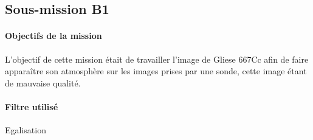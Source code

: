 	\subsection{Sous-mission B1}

	\begin{vwcol}[widths={0.8,0.2}, rule=0pt]
	\begin{minipage}{0.7\textwidth}
	\paragraph{Objectifs de la mission}

	L'objectif de cette mission était de travailler l'image de Gliese 667Cc afin de faire apparaître son atmosphère sur les images prises par une sonde, cette image étant de mauvaise qualité. 
	\end{minipage}
	\begin{minipage}{0.2\textwidth}
		\begin{flushright}
			\paragraph{Filtre utilisé}
		Egalisation
		\end{flushright}
	\end{minipage}
	\end{vwcol} 

